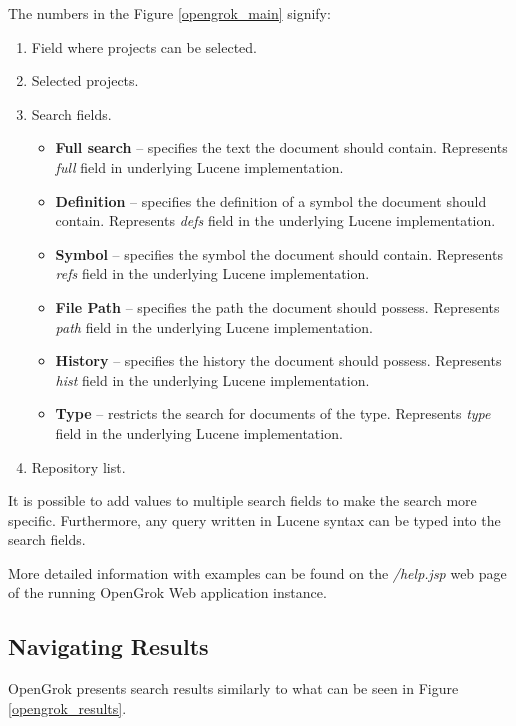 The numbers in the Figure \ref{opengrok_main} signify:
\begin{enumerate}
    \item Field where projects can be selected.
    \item Selected projects.
    \item Search fields.
       \begin{itemize}
        \item \textbf{Full search} – specifies the text the document should contain. Represents \textit{full} field in
        underlying Lucene implementation.
        \item \textbf{Definition} – specifies the definition of a symbol the document should contain.
        Represents \textit{defs} field in the underlying Lucene implementation.
        \item \textbf{Symbol} – specifies the symbol the document should contain.
        Represents \textit{refs} field in the underlying Lucene implementation.
        \item \textbf{File Path} – specifies the path the document should possess.
        Represents \textit{path} field in the underlying Lucene implementation.
        \item \textbf{History} – specifies the history the document should possess.
        Represents \textit{hist} field in the underlying Lucene implementation.
        \item \textbf{Type} – restricts the search for documents of the type.
        Represents \textit{type} field in the underlying Lucene implementation.
       \end{itemize}
    \item Repository list.
\end{enumerate}

It is possible to add values to multiple search fields to make the search more specific. Furthermore, any query written
in Lucene syntax can be typed into the search fields.

More detailed information with examples can be found on the \textit{/help.jsp} web page of the running OpenGrok Web application instance.

\subsection{Navigating Results}

OpenGrok presents search results similarly to what can be seen in Figure \ref{opengrok_results}.

